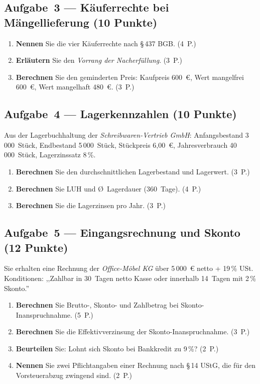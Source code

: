 \documentclass[11pt, a4paper]{article}
\begin{document}
\subsection*{Aufgabe~3 --- Käuferrechte bei Mängellieferung (10 Punkte)}

\begin{enumerate}[label=(\alph*)]
  \item \textbf{Nennen} Sie die vier Käuferrechte nach §\,437 BGB. \hfill (4~P.)
  \item \textbf{Erläutern} Sie den \emph{Vorrang der Nacherfüllung}. \hfill (3~P.)
  \item \textbf{Berechnen} Sie den geminderten Preis: Kaufpreis 600~€, Wert mangelfrei 600~€, Wert mangelhaft 480~€. \hfill (3~P.)
\end{enumerate}

\subsection*{Aufgabe~4 --- Lagerkennzahlen (10 Punkte)}

Aus der Lagerbuchhaltung der \emph{Schreibwaren-Vertrieb GmbH}: Anfangsbestand
3\,000~Stück, Endbestand 5\,000~Stück, Stückpreis 6,00~€, Jahresverbrauch
40\,000~Stück, Lagerzinssatz 8\,\%.

\begin{enumerate}[label=(\alph*)]
  \item \textbf{Berechnen} Sie den durchschnittlichen Lagerbestand und Lagerwert. \hfill (3~P.)
  \item \textbf{Berechnen} Sie LUH und Ø~Lagerdauer (360~Tage). \hfill (4~P.)
  \item \textbf{Berechnen} Sie die Lagerzinsen pro Jahr. \hfill (3~P.)
\end{enumerate}

\subsection*{Aufgabe~5 --- Eingangsrechnung und Skonto (12 Punkte)}

Sie erhalten eine Rechnung der \emph{Office-Möbel KG} über 5\,000~€ netto + 19\,\% USt.
Konditionen: ,,Zahlbar in 30~Tagen netto Kasse oder innerhalb 14~Tagen mit 2\,\% Skonto.''

\begin{enumerate}[label=(\alph*)]
  \item \textbf{Berechnen} Sie Brutto-, Skonto- und Zahlbetrag bei Skonto-Inanspruchnahme. \hfill (5~P.)
  \item \textbf{Berechnen} Sie die Effektivverzinsung der Skonto-Inanspruchnahme. \hfill (3~P.)
  \item \textbf{Beurteilen} Sie: Lohnt sich Skonto bei Bankkredit zu 9\,\%? \hfill (2~P.)
  \item \textbf{Nennen} Sie zwei Pflichtangaben einer Rechnung nach §\,14 UStG, die für den Vorsteuerabzug zwingend sind. \hfill (2~P.)
\end{enumerate}
\end{document}
